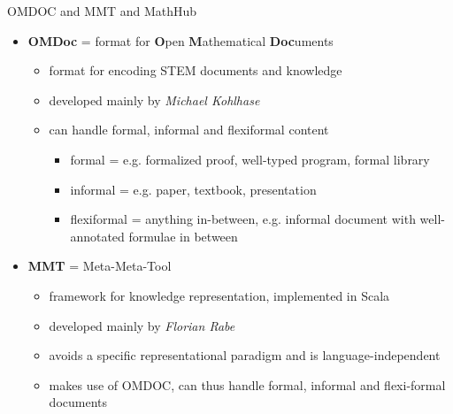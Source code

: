 \documentclass{beamer}
\begin{document}
    \begin{frame}{OMDOC and MMT and MathHub}
        \begin{itemize}
            \item \textbf{OMDoc} = format for \textbf{O}pen \textbf{M}athematical \textbf{Doc}uments
            \begin{itemize}
                \item format for encoding STEM documents and knowledge
                \item developed mainly by \textit{Michael Kohlhase}
                \item can handle formal, informal and flexiformal content
                \begin{itemize}
                    \item formal = e.g. formalized proof, well-typed program, formal library
                    \item informal = e.g. paper, textbook, presentation
                    \item flexiformal = anything in-between, e.g. informal document with well-annotated formulae in between
                \end{itemize}
            \end{itemize}
            \item \textbf{MMT} = Meta-Meta-Tool
            \begin{itemize}
                \item framework for knowledge representation, implemented in Scala
                \item developed mainly by \textit{Florian Rabe}
                \item avoids a specific representational paradigm and is language-independent
                \item makes use of OMDOC, can thus handle formal, informal and flexi-formal documents
            \end{itemize}
        \end{itemize}
    \end{frame}
\end{document}
